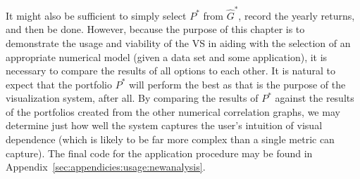 It might also be sufficient to simply select $P^*$ from $\hat{G}^*$, record the 
yearly returns, and then be done. However, because the purpose of this chapter 
is to demonstrate the usage and viability of the VS in aiding with the 
selection of an appropriate numerical model (given a data set and some 
application), it is necessary to compare the results of all options to each 
other. 
It is natural to expect that the portfolio $P^*$ will perform the best 
as that is the purpose of the visualization system, after all. 
By comparing the results of $P^*$ against the results of the portfolios created 
from the other numerical correlation graphs, we may determine just how well the 
system captures the user's intuition of visual dependence (which is likely to 
be far more complex than a single metric can capture).
The final code for the application procedure may be found in 
Appendix~\ref{sec:appendicies:usage:newanalysis}.